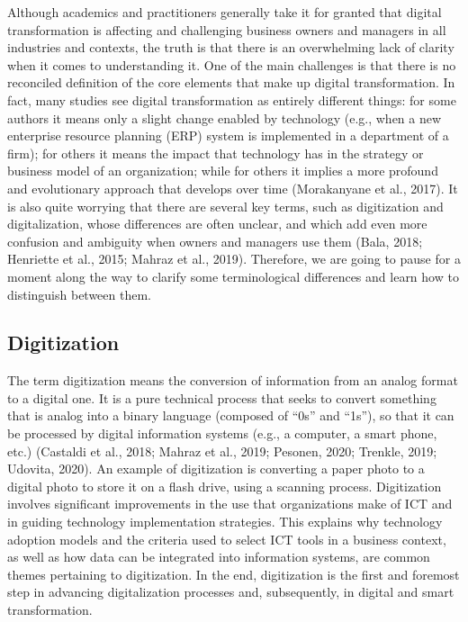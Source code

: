 \documentclass[
  letterpaper,
  DIV=11,
  numbers=noendperiod]{scrreprt}
\begin{document}
Although academics and practitioners generally take it for granted that
digital transformation is affecting and challenging business owners and
managers in all industries and contexts, the truth is that there is an
overwhelming lack of clarity when it comes to understanding it. One of
the main challenges is that there is no reconciled definition of the
core elements that make up digital transformation. In fact, many studies
see digital transformation as entirely different things: for some
authors it means only a slight change enabled by technology (e.g., when
a new enterprise resource planning (ERP) system is implemented in a
department of a firm); for others it means the impact that technology
has in the strategy or business model of an organization; while for
others it implies a more profound and evolutionary approach that
develops over time (Morakanyane et al., 2017). It is also quite worrying
that there are several key terms, such as digitization and
digitalization, whose differences are often unclear, and which add even
more confusion and ambiguity when owners and managers use them (Bala,
2018; Henriette et al., 2015; Mahraz et al., 2019). Therefore, we are
going to pause for a moment along the way to clarify some terminological
differences and learn how to distinguish between them.

\hypertarget{digitization}{%
\subsection{Digitization}\label{digitization}}

The term digitization means the conversion of information from an analog
format to a digital one. It is a pure technical process that seeks to
convert something that is analog into a binary language (composed of
``0s'' and ``1s''), so that it can be processed by digital information
systems (e.g., a computer, a smart phone, etc.) (Castaldi et al., 2018;
Mahraz et al., 2019; Pesonen, 2020; Trenkle, 2019; Udovita, 2020). An
example of digitization is converting a paper photo to a digital photo
to store it on a flash drive, using a scanning process. Digitization
involves significant improvements in the use that organizations make of
ICT and in guiding technology implementation strategies. This explains
why technology adoption models and the criteria used to select ICT tools
in a business context, as well as how data can be integrated into
information systems, are common themes pertaining to digitization. In
the end, digitization is the first and foremost step in advancing
digitalization processes and, subsequently, in digital and smart
transformation.
\end{document}
